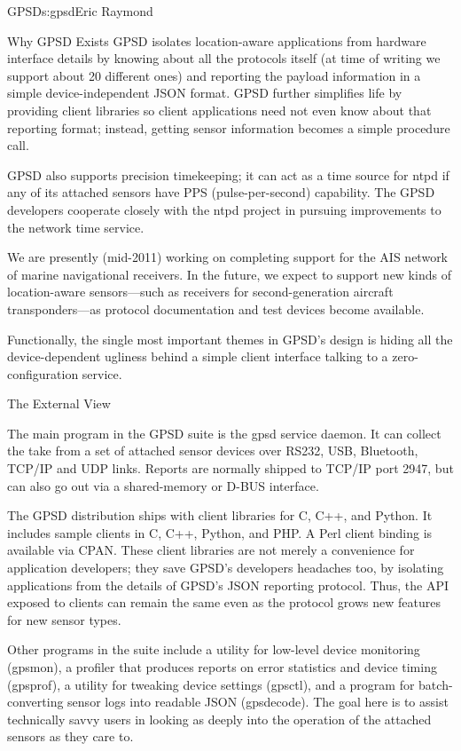 \begin{aosachapter}{GPSD}{s:gpsd}{Eric Raymond}
\begin{aosasect1}{Why GPSD Exists}
GPSD isolates location-aware applications from hardware interface
details by knowing about all the protocols itself (at time of writing
we support about 20 different ones) and reporting the payload
information in a simple device-independent JSON format.  GPSD further
simplifies life by providing client libraries so client applications
need not even know about that reporting format; instead, getting
sensor information becomes a simple procedure call.

GPSD also supports precision timekeeping; it can act as a time source
for ntpd if any of its attached sensors have PPS (pulse-per-second)
capability. The GPSD developers cooperate closely with the ntpd
project in pursuing improvements to the network time service.

We are presently (mid-2011) working on completing support for the AIS
network of marine navigational receivers.  In the future, we expect to
support new kinds of location-aware sensors---such as receivers for
second-generation aircraft transponders---as protocol documentation
and test devices become available.

Functionally, the single most important themes in GPSD's design is
hiding all the device-dependent ugliness behind a simple client
interface talking to a zero-configuration service.

\end{aosasect1}

\begin{aosasect1}{The External View}

The main program in the GPSD suite is the gpsd service daemon.  It can
collect the take from a set of attached sensor devices over RS232, USB,
Bluetooth, TCP/IP and UDP links. Reports are normally shipped to
TCP/IP port 2947, but can also go out via a shared-memory or
D-BUS interface.

The GPSD distribution ships with client libraries for C, C++, and
Python.  It includes sample clients in C, C++, Python, and PHP. A Perl
client binding is available via CPAN.  These client libraries are not
merely a convenience for application developers; they save GPSD's
developers headaches too, by isolating applications from the details
of GPSD's JSON reporting protocol.  Thus, the API exposed to clients
can remain the same even as the protocol grows new features for new
sensor types.

Other programs in the suite include a utility for low-level device
monitoring (gpsmon), a profiler that produces reports on error
statistics and device timing (gpsprof), a utility for tweaking device
settings (gpsctl), and a program for batch-converting sensor logs into
readable JSON (gpsdecode). The goal here is to assist technically
savvy users in looking as deeply into the operation of the attached
sensors as they care to.


\end{aosasect1}
\end{aosachapter}
